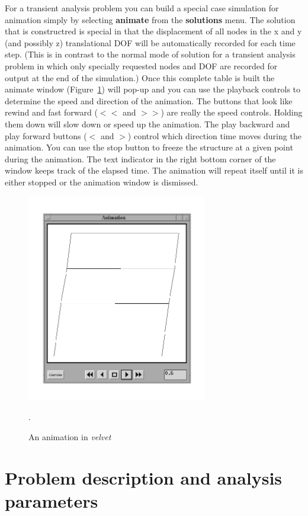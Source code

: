 For a transient analysis problem you can build a special case simulation
for animation simply by selecting {\bf animate} from the {\bf solutions}
menu.  The solution that is constructred is special in that the displacement
of all nodes in the x and y (and possibly z) translational DOF will be 
automatically recorded
for each time step.  (This is in contrast to the normal mode of solution for
a transient analysis problem in which only specially requested nodes and
DOF are recorded for output at the end of the simulation.)  Once this
complete table is built the animate window (Figure~\ref{velvet.animate}) 
will pop-up 
and you can use the playback controls to determine the speed and direction 
of the animation.  The buttons that look like rewind and fast forward
($<<$ and $>>$) are really the speed controls.  Holding them down will
slow down or speed up the animation.  The play backward and play
forward buttons ($<$ and $>$) control which direction time moves during
the animation.  You can use the stop button to freeze the structure at a given
point during the animation.  The text indicator in the right bottom corner
of the window keeps track of the elapsed time.  The animation will
repeat itself until it is either stopped or the animation window is dismissed.

\begin{figure}
\begin{center}
 \includegraphics[width=3.10in]{figures/velvet_animate}
\end{center}
\caption{An animation in {\em velvet}}.
\label{velvet.animate}
\end{figure}

\section{Problem description and analysis parameters}

